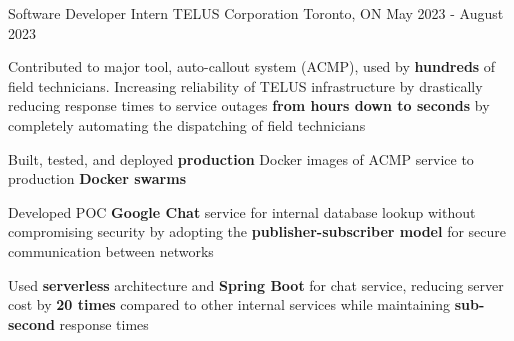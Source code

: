 \begin{cventries}
	\cventry
	{Software Developer Intern} %
	{TELUS Corporation} %
	{Toronto, ON} %
	{May 2023 - August 2023} %
	{
		\begin{cvitems} %
			\item {Contributed to major tool, auto-callout system (ACMP), used by \textbf{hundreds} of field technicians. Increasing reliability of TELUS infrastructure by drastically reducing response times to service outages \textbf{from hours down to seconds} by completely automating the dispatching of field technicians}
			\item {Built, tested, and deployed \textbf{production} Docker images of ACMP service to production \textbf{Docker swarms}}
			\item {Developed POC \textbf{Google Chat} service for internal database lookup without compromising security by adopting the \textbf{publisher-subscriber model} for secure communication between networks}
			\item {Used \textbf{serverless} architecture and \textbf{Spring Boot} for chat service, reducing server cost by \textbf{20 times} compared to other internal services while maintaining \textbf{sub-second} response times}
		\end{cvitems}
	}


\end{cventries}
